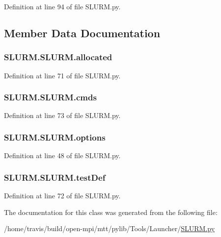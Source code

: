 Definition at line 94 of file S\-L\-U\-R\-M.\-py.



\subsection{Member Data Documentation}
\hypertarget{classSLURM_1_1SLURM_aee4130d6ff2007d08fad045aedd69781}{
\subsubsection[{allocated}]{\setlength{\rightskip}{0pt plus 5cm}S\-L\-U\-R\-M.\-S\-L\-U\-R\-M.\-allocated}}\label{classSLURM_1_1SLURM_aee4130d6ff2007d08fad045aedd69781}


Definition at line 71 of file S\-L\-U\-R\-M.\-py.

\hypertarget{classSLURM_1_1SLURM_ab755a940fd09c8fa416c177f692d31d6}{
\subsubsection[{cmds}]{\setlength{\rightskip}{0pt plus 5cm}S\-L\-U\-R\-M.\-S\-L\-U\-R\-M.\-cmds}}\label{classSLURM_1_1SLURM_ab755a940fd09c8fa416c177f692d31d6}


Definition at line 73 of file S\-L\-U\-R\-M.\-py.

\hypertarget{classSLURM_1_1SLURM_a652a43986b8bda5c6ddb866ab0513ac8}{
\subsubsection[{options}]{\setlength{\rightskip}{0pt plus 5cm}S\-L\-U\-R\-M.\-S\-L\-U\-R\-M.\-options}}\label{classSLURM_1_1SLURM_a652a43986b8bda5c6ddb866ab0513ac8}


Definition at line 48 of file S\-L\-U\-R\-M.\-py.

\hypertarget{classSLURM_1_1SLURM_a9b08ef79e039a8524f1fa6712b45182b}{
\subsubsection[{test\-Def}]{\setlength{\rightskip}{0pt plus 5cm}S\-L\-U\-R\-M.\-S\-L\-U\-R\-M.\-test\-Def}}\label{classSLURM_1_1SLURM_a9b08ef79e039a8524f1fa6712b45182b}


Definition at line 72 of file S\-L\-U\-R\-M.\-py.



The documentation for this class was generated from the following file\-:\begin{DoxyCompactItemize}
\item 
/home/travis/build/open-\/mpi/mtt/pylib/\-Tools/\-Launcher/\hyperlink{SLURM_8py}{S\-L\-U\-R\-M.\-py}\end{DoxyCompactItemize}

